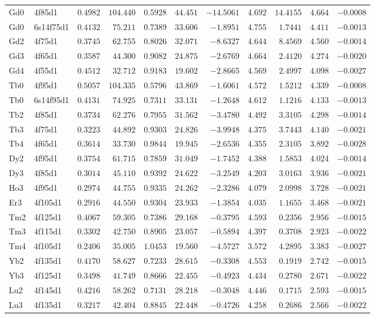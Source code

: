 \begin{table}[H]
{\begin{tabular}{llrrrrrrrrr}
Gd0 & 4f85d1 &$0.4982$ &$104.440$ &$0.5928$ &$44.451$ &$-14.5061$ &$4.692$ &$14.4155$ &$4.664$ &$-0.0008$ \\
Gd0 & 6s14f75d1 &$0.4132$ &$75.211$ &$0.7389$ &$33.606$ &$-1.8951$ &$4.755$ &$1.7441$ &$4.411$ &$-0.0013$ \\
Gd2 & 4f75d1 &$0.3745$ &$62.755$ &$0.8026$ &$32.071$ &$-8.6327$ &$4.644$ &$8.4569$ &$4.560$ &$-0.0014$ \\
Gd3 & 4f65d1 &$0.3587$ &$44.300$ &$0.9082$ &$24.875$ &$-2.6769$ &$4.664$ &$2.4120$ &$4.274$ &$-0.0020$ \\
Gd4 & 4f55d1 &$0.4512$ &$32.712$ &$0.9183$ &$19.602$ &$-2.8665$ &$4.569$ &$2.4997$ &$4.098$ &$-0.0027$ \\
Tb0 & 4f95d1 &$0.5057$ &$104.335$ &$0.5796$ &$43.869$ &$-1.6061$ &$4.572$ &$1.5212$ &$4.339$ &$-0.0008$ \\
Tb0 & 6s14f95d1 &$0.4131$ &$74.925$ &$0.7311$ &$33.131$ &$-1.2648$ &$4.612$ &$1.1216$ &$4.133$ &$-0.0013$ \\
Tb2 & 4f85d1 &$0.3734$ &$62.276$ &$0.7955$ &$31.562$ &$-3.4780$ &$4.492$ &$3.3105$ &$4.298$ &$-0.0014$ \\
Tb3 & 4f75d1 &$0.3223$ &$44.892$ &$0.9303$ &$24.826$ &$-3.9948$ &$4.375$ &$3.7443$ &$4.140$ &$-0.0021$ \\
Tb4 & 4f65d1 &$0.3614$ &$33.730$ &$0.9844$ &$19.945$ &$-2.6536$ &$4.355$ &$2.3105$ &$3.892$ &$-0.0028$ \\
Dy2 & 4f95d1 &$0.3754$ &$61.715$ &$0.7859$ &$31.049$ &$-1.7452$ &$4.388$ &$1.5853$ &$4.024$ &$-0.0014$ \\
Dy3 & 4f85d1 &$0.3014$ &$45.110$ &$0.9392$ &$24.622$ &$-3.2549$ &$4.203$ &$3.0163$ &$3.936$ &$-0.0021$ \\
Ho3 & 4f95d1 &$0.2974$ &$44.755$ &$0.9335$ &$24.262$ &$-2.3286$ &$4.079$ &$2.0998$ &$3.728$ &$-0.0021$ \\
Er3 & 4f105d1 &$0.2916$ &$44.550$ &$0.9304$ &$23.933$ &$-1.3854$ &$4.035$ &$1.1655$ &$3.468$ &$-0.0021$ \\
Tm2 & 4f125d1 &$0.4067$ &$59.305$ &$0.7386$ &$29.168$ &$-0.3795$ &$4.593$ &$0.2356$ &$2.956$ &$-0.0015$ \\
Tm3 & 4f115d1 &$0.3302$ &$42.750$ &$0.8905$ &$23.057$ &$-0.5894$ &$4.397$ &$0.3708$ &$2.923$ &$-0.0022$ \\
Tm4 & 4f105d1 &$0.2406$ &$35.005$ &$1.0453$ &$19.560$ &$-4.5727$ &$3.572$ &$4.2895$ &$3.383$ &$-0.0027$ \\
Yb2 & 4f135d1 &$0.4170$ &$58.627$ &$0.7233$ &$28.615$ &$-0.3308$ &$4.553$ &$0.1919$ &$2.742$ &$-0.0015$ \\
Yb3 & 4f125d1 &$0.3498$ &$41.749$ &$0.8666$ &$22.455$ &$-0.4923$ &$4.434$ &$0.2780$ &$2.671$ &$-0.0022$ \\
Lu2 & 4f145d1 &$0.4216$ &$58.262$ &$0.7131$ &$28.218$ &$-0.3048$ &$4.446$ &$0.1715$ &$2.593$ &$-0.0015$ \\
Lu3 & 4f135d1 &$0.3217$ &$42.404$ &$0.8845$ &$22.448$ &$-0.4726$ &$4.258$ &$0.2686$ &$2.566$ &$-0.0022$ \\
\hline
\end{tabular}
}
\end{table}
